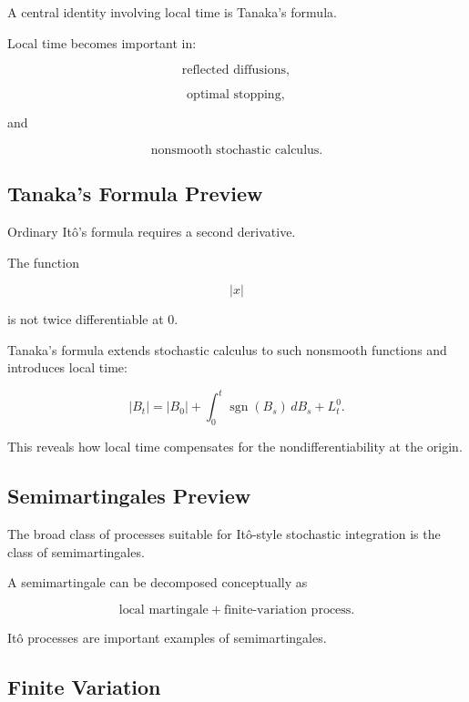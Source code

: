 A central identity involving local time is Tanaka's formula.

Local time becomes important in:

\[
\text{reflected diffusions},
\]

\[
\text{optimal stopping},
\]

and

\[
\text{nonsmooth stochastic calculus}.
\]

\subsection{Tanaka's Formula Preview}
\label{subsec:tanaka-preview}

Ordinary It\^o's formula requires a second derivative.

The function

\[
|x|
\]

is not twice differentiable at \(0\).

Tanaka's formula extends stochastic calculus to such nonsmooth
functions and introduces local time:

\[
\boxed{
|B_t|
=
|B_0|
+
\int_0^t
\operatorname{sgn}(B_s)\,dB_s
+
L_t^0.
}
\]

This reveals how local time compensates for the nondifferentiability at
the origin.

\subsection{Semimartingales Preview}
\label{subsec:semimartingales-preview}

The broad class of processes suitable for It\^o-style stochastic
integration is the class of semimartingales.

A semimartingale can be decomposed conceptually as

\[
\boxed{
\text{local martingale}
+
\text{finite-variation process}.
}
\]

It\^o processes are important examples of semimartingales.

\subsection{Finite Variation}
\label{subsec:finite-variation-stochastic}

